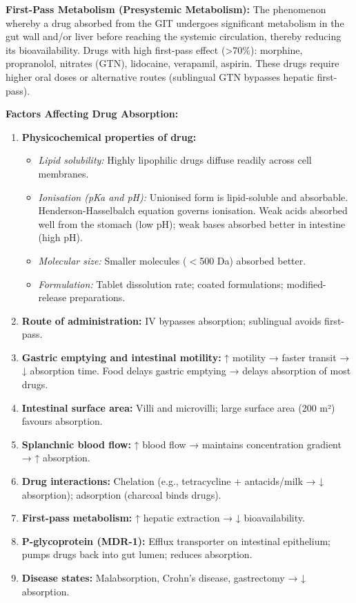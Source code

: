 \documentclass[11pt,a4paper]{article}
\begin{document}
\begin{ansbox}
\textbf{First-Pass Metabolism (Presystemic Metabolism):}
The phenomenon whereby a drug absorbed from the GIT undergoes significant metabolism in the gut wall and/or liver before reaching the systemic circulation, thereby reducing its bioavailability. Drugs with high first-pass effect (\textgreater{}70\%): morphine, propranolol, nitrates (GTN), lidocaine, verapamil, aspirin. These drugs require higher oral doses or alternative routes (sublingual GTN bypasses hepatic first-pass).

\textbf{Factors Affecting Drug Absorption:}
\begin{enumerate}[leftmargin=*]
    \item \textbf{Physicochemical properties of drug:}
    \begin{itemize}
        \item \textit{Lipid solubility:} Highly lipophilic drugs diffuse readily across cell membranes.
        \item \textit{Ionisation (pKa and pH):} Unionised form is lipid-soluble and absorbable. Henderson-Hasselbalch equation governs ionisation. Weak acids absorbed well from the stomach (low pH); weak bases absorbed better in intestine (high pH).
        \item \textit{Molecular size:} Smaller molecules ($<$500 Da) absorbed better.
        \item \textit{Formulation:} Tablet dissolution rate; coated formulations; modified-release preparations.
    \end{itemize}
    \item \textbf{Route of administration:} IV bypasses absorption; sublingual avoids first-pass.
    \item \textbf{Gastric emptying and intestinal motility:} ↑ motility → faster transit → ↓ absorption time. Food delays gastric emptying → delays absorption of most drugs.
    \item \textbf{Intestinal surface area:} Villi and microvilli; large surface area (200 m²) favours absorption.
    \item \textbf{Splanchnic blood flow:} ↑ blood flow → maintains concentration gradient → ↑ absorption.
    \item \textbf{Drug interactions:} Chelation (e.g., tetracycline + antacids/milk → ↓ absorption); adsorption (charcoal binds drugs).
    \item \textbf{First-pass metabolism:} ↑ hepatic extraction → ↓ bioavailability.
    \item \textbf{P-glycoprotein (MDR-1):} Efflux transporter on intestinal epithelium; pumps drugs back into gut lumen; reduces absorption.
    \item \textbf{Disease states:} Malabsorption, Crohn's disease, gastrectomy → ↓ absorption.
\end{enumerate}
\end{ansbox}
\end{document}
